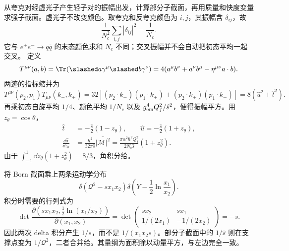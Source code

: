 \begin{derivation}
从夸克对经虚光子产生轻子对的振幅出发，计算部分子截面，再用质量和快度变量求强子截面。虚光子不改变颜色。取夸克和反夸克颜色为 $i,j$，其振幅含 $\delta_{ij}$，故
\begin{equation*}
 \frac1{N_c^2}\sum_{i,j}|\delta_{ij}|^2=\frac1{N_c}.
\end{equation*}
它与 $e^+e^-\to q\bar q$ 的末态颜色求和 $N_c$ 不同；交叉振幅并不会自动把初态平均一起交叉。
定义
\begin{equation*}
 T^{\mu\nu}(a,b)=\Tr(\slashed a\gamma^\mu\slashed b\gamma^\nu)
 =4(a^\mu b^\nu+a^\nu b^\mu-\eta^{\mu\nu}a\cdot b).
\end{equation*}
两迹的指标缩并为
\begin{equation*}
 T^{\mu\nu}(p_2,p_1)T_{\mu\nu}(k_-,k_+)
 =32[(p_2\cdot k_-)(p_1\cdot k_+)+(p_2\cdot k_+)(p_1\cdot k_-)]
 =8(\hat u^2+\hat t^2).
\end{equation*}
再乘初态自旋平均 $1/4$、颜色平均 $1/N_c$ 以及 $g_{\rm em}^4Q_f^2/\hat s^2$，便得振幅平方。用 $z_\theta=\cos\theta$，
\begin{align*}
 \hat t&=-\frac{\hat s}{2}(1-z_\theta),\qquad
 \hat u=-\frac{\hat s}{2}(1+z_\theta),\\
 \frac{\dd\hat\sigma}{\dd z_\theta}
 &=\frac{\hbar^2}{32\pi\hat s}\overline{|\mathcal M|^2}
 =\frac{\pi\alpha^2\hbar^2Q_f^2}{2N_c\hat s}(1+z_\theta^2).
\end{align*}
由于 $\int_{-1}^{1}\dd z_\theta(1+z_\theta^2)=8/3$，角积分给。

将 Born 截面乘上两条运动学分布
\begin{equation*}
 \delta(\mathcal Q^2-sx_1x_2)
 \delta\!\left(Y-\frac12\ln\frac{x_1}{x_2}\right).
\end{equation*}
积分时需要的行列式为
\begin{equation*}
 \det\frac{\partial(sx_1x_2,\frac12\ln(x_1/x_2))}{\partial(x_1,x_2)}
 =\det\begin{pmatrix}sx_2&sx_1\\1/(2x_1)&-1/(2x_2)\end{pmatrix}=-s.
\end{equation*}
因此两次 delta 积分产生 $1/s$，而不是 $1/(x_1x_2s)$。部分子截面中的 $1/\hat s$ 则在支撑点变为 $1/\mathcal Q^2$，二者合并给。其量纲为面积除以动量平方，与左边完全一致。
\end{derivation}

